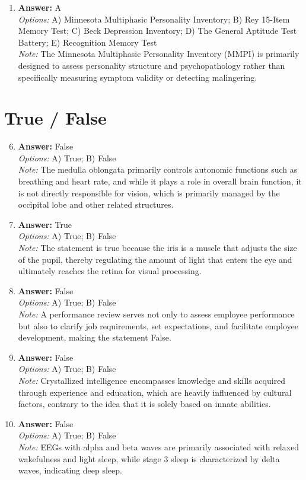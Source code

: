 \documentclass[12pt]{article}
\begin{document}
\begin{enumerate}[label=\arabic*.]
\item \textbf{Answer:} A
\\ \textit{Options:} A) Minnesota Multiphasic Personality Inventory; B) Rey 15-Item Memory Test; C) Beck Depression Inventory; D) The General Aptitude Test Battery; E) Recognition Memory Test
\\ \textit{Note:} The Minnesota Multiphasic Personality Inventory (MMPI) is primarily designed to assess personality structure and psychopathology rather than specifically measuring symptom validity or detecting malingering.
\end{enumerate}

\section*{True / False}
\begin{enumerate}[label=\arabic*.]
\setcounter{enumi}{5}
\item \textbf{Answer:} False
\\ \textit{Options:} A) True; B) False
\\ \textit{Note:} The medulla oblongata primarily controls autonomic functions such as breathing and heart rate, and while it plays a role in overall brain function, it is not directly responsible for vision, which is primarily managed by the occipital lobe and other related structures.
\item \textbf{Answer:} True
\\ \textit{Options:} A) True; B) False
\\ \textit{Note:} The statement is true because the iris is a muscle that adjusts the size of the pupil, thereby regulating the amount of light that enters the eye and ultimately reaches the retina for visual processing.
\item \textbf{Answer:} False
\\ \textit{Options:} A) True; B) False
\\ \textit{Note:} A performance review serves not only to assess employee performance but also to clarify job requirements, set expectations, and facilitate employee development, making the statement False.
\item \textbf{Answer:} False
\\ \textit{Options:} A) True; B) False
\\ \textit{Note:} Crystallized intelligence encompasses knowledge and skills acquired through experience and education, which are heavily influenced by cultural factors, contrary to the idea that it is solely based on innate abilities.
\item \textbf{Answer:} False
\\ \textit{Options:} A) True; B) False
\\ \textit{Note:} EEGs with alpha and beta waves are primarily associated with relaxed wakefulness and light sleep, while stage 3 sleep is characterized by delta waves, indicating deep sleep.
\end{enumerate}
\end{document}
